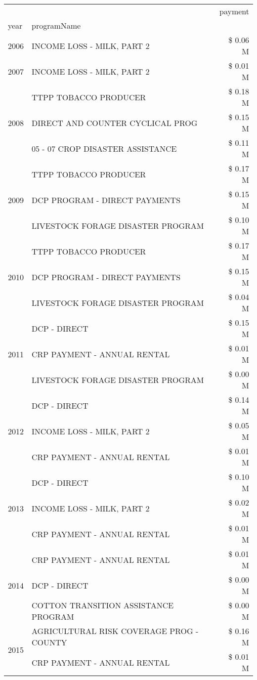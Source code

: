 \begin{tabular}{llr}
\toprule
 &  & payment \\
year & programName &  \\
\midrule
2006 & INCOME LOSS - MILK, PART 2 & \$ 0.06 M \\
\cline{1-3}
2007 & INCOME LOSS - MILK, PART 2 & \$ 0.01 M \\
\cline{1-3}
\multirow[t]{3}{*}{2008} & TTPP TOBACCO PRODUCER & \$ 0.18 M \\
 & DIRECT AND COUNTER CYCLICAL PROG & \$ 0.15 M \\
 & 05 - 07 CROP DISASTER ASSISTANCE & \$ 0.11 M \\
\cline{1-3}
\multirow[t]{3}{*}{2009} & TTPP TOBACCO PRODUCER & \$ 0.17 M \\
 & DCP PROGRAM - DIRECT PAYMENTS & \$ 0.15 M \\
 & LIVESTOCK FORAGE DISASTER  PROGRAM & \$ 0.10 M \\
\cline{1-3}
\multirow[t]{3}{*}{2010} & TTPP TOBACCO PRODUCER & \$ 0.17 M \\
 & DCP PROGRAM - DIRECT PAYMENTS & \$ 0.15 M \\
 & LIVESTOCK FORAGE DISASTER  PROGRAM & \$ 0.04 M \\
\cline{1-3}
\multirow[t]{3}{*}{2011} & DCP - DIRECT & \$ 0.15 M \\
 & CRP PAYMENT - ANNUAL RENTAL & \$ 0.01 M \\
 & LIVESTOCK FORAGE DISASTER PROGRAM & \$ 0.00 M \\
\cline{1-3}
\multirow[t]{3}{*}{2012} & DCP - DIRECT & \$ 0.14 M \\
 & INCOME LOSS - MILK, PART 2 & \$ 0.05 M \\
 & CRP PAYMENT - ANNUAL RENTAL & \$ 0.01 M \\
\cline{1-3}
\multirow[t]{3}{*}{2013} & DCP - DIRECT & \$ 0.10 M \\
 & INCOME LOSS - MILK, PART 2 & \$ 0.02 M \\
 & CRP PAYMENT - ANNUAL RENTAL & \$ 0.01 M \\
\cline{1-3}
\multirow[t]{3}{*}{2014} & CRP PAYMENT - ANNUAL RENTAL & \$ 0.01 M \\
 & DCP - DIRECT & \$ 0.00 M \\
 & COTTON TRANSITION ASSISTANCE PROGRAM & \$ 0.00 M \\
\cline{1-3}
\multirow[t]{3}{*}{2015} & AGRICULTURAL RISK COVERAGE PROG - COUNTY & \$ 0.16 M \\
 & CRP PAYMENT - ANNUAL RENTAL & \$ 0.01 M \\

\end{tabular}
